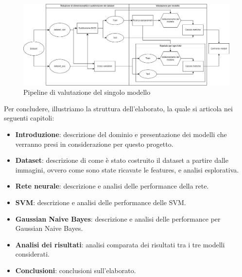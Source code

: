 \begin{figure}[!ht]
      \centering
      \includegraphics[width=\textwidth]{img/introduzione/schema_pipeline_valutazione_modelli.png}
      \caption{Pipeline di valutazione del singolo modello}
      \label{fig:pipeline}
\end{figure}

Per concludere, illustriamo la struttura dell'elaborato, la quale si articola
nei seguenti capitoli:
\begin{itemize}
    \item \textbf{Introduzione}: descrizione del dominio e presentazione dei
          modelli che verranno presi in considerazione per questo progetto.
    \item \textbf{Dataset}: descrizione di come è stato costruito il dataset a
          partire dalle immagini, ovvero come sono state ricavate le features, e
          analisi esplorativa.
    \item \textbf{Rete neurale}: descrizione e analisi delle performance della
          rete.
    \item \textbf{SVM}: descrizione e analisi delle performance delle SVM.
    \item \textbf{Gaussian Naive Bayes}: descrizione e analisi delle performance
          per Gaussian Naive Bayes.
    \item \textbf{Analisi dei risultati}: analisi comparata dei risultati tra i
          tre modelli considerati.
    \item \textbf{Conclusioni}: conclusioni sull'elaborato.
\end{itemize}